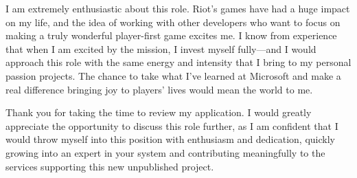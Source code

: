 \documentclass[12pt,a4paper,sans]{moderncv}
\begin{document}
I am extremely enthusiastic about this role.  Riot's games have had a huge impact on my life, and the idea of working with other developers who want to focus on making a truly wonderful player-first game excites me.   I know from experience that when I am excited by the mission, I invest myself fully—and I would approach this role with the same energy and intensity that I bring to my personal passion projects.  The chance to take what I've learned at Microsoft and make a real difference bringing joy to players' lives would mean the world to me.

Thank you for taking the time to review my application. I would greatly appreciate the opportunity to discuss this role further, as I am confident that I would throw myself into this position with enthusiasm and dedication, quickly growing into an expert in your system and contributing meaningfully to the services supporting this new unpublished project.

\makeletterclosing
\end{document}
